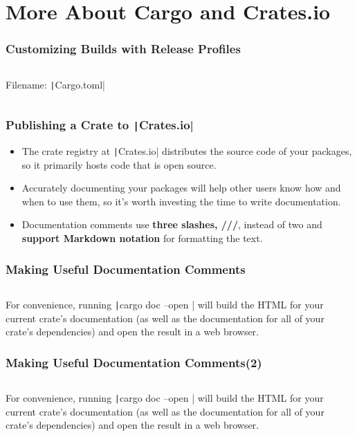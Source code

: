 \documentclass{beamer}
\begin{document}
\section{More About Cargo and Crates.io}

\begin{frame}[fragile]
	\frametitle{Customizing Builds with Release Profiles}

\inputminted{shell}{./code/profile.shell}

Filename: \texttt|Cargo.toml| 

\inputminted{toml}{./code/profile2.toml}

\end{frame} 



\begin{frame}[fragile]
	\frametitle{Publishing a Crate to \texttt|Crates.io|}
	
	\begin{itemize}
		\item The crate registry at \texttt|Crates.io| distributes the source code of your packages, so it primarily hosts code that is open source.
		\item 	Accurately documenting your packages will help other users know how and when to use them, so it’s worth investing the time to write documentation. 
		\item 	Documentation comments use \textbf{three slashes, ///}, instead of two and \textbf{support Markdown notation} for formatting the text.
	\end{itemize}
\end{frame} 


\begin{frame}[fragile]
	\frametitle{Making Useful Documentation Comments}
	\inputminted{rust}{./code/documentation.rs}
	
	For convenience, running \texttt|cargo doc --open | will build the HTML for your current crate’s documentation (as well as the documentation for all of your crate’s dependencies) and open the result in a web browser.
\end{frame} 


\begin{frame}[fragile]
	\frametitle{Making Useful Documentation Comments(2)}
	\inputminted{rust}{./code/documentation.rs}
	
	For convenience, running \texttt|cargo doc --open | will build the HTML for your current crate’s documentation (as well as the documentation for all of your crate’s dependencies) and open the result in a web browser.
\end{frame} 
\end{document}
